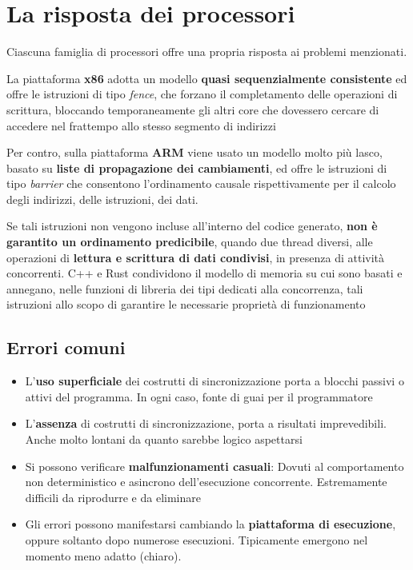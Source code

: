 \section{La risposta dei processori}

Ciascuna famiglia di processori offre una propria risposta ai problemi menzionati.

La piattaforma \textbf{x86} adotta un modello \textbf{quasi sequenzialmente consistente} ed offre
le istruzioni di tipo \textit{fence}, che forzano il completamento delle operazioni di
scrittura, bloccando temporaneamente gli altri core che dovessero cercare di
accedere nel frattempo allo stesso segmento di indirizzi

Per contro, sulla
piattaforma \textbf{ARM} viene usato un modello molto più lasco, basato su \textbf{liste di
  propagazione dei cambiamenti}, ed offre le istruzioni di tipo \textit{barrier} che
consentono l'ordinamento causale rispettivamente per il calcolo degli indirizzi,
delle istruzioni, dei dati.


Se tali istruzioni non vengono incluse all'interno del codice generato, \textbf{non è
  garantito un ordinamento predicibile}, quando due thread diversi, alle operazioni di \textbf{lettura e scrittura di
  dati condivisi}, in presenza di attività concorrenti.
C++ e Rust condividono il
modello di memoria su cui sono basati e annegano, nelle funzioni di libreria dei
tipi dedicati alla concorrenza, tali istruzioni allo scopo di garantire le
necessarie proprietà di funzionamento



\subsection{Errori comuni}

\begin{itemize}
  \item L'\textbf{uso superficiale} dei costrutti di sincronizzazione porta a blocchi
        passivi o attivi del programma. In ogni caso, fonte di guai per il
        programmatore
  \item L'\textbf{assenza} di costrutti di sincronizzazione, porta a risultati
        imprevedibili. Anche molto lontani da quanto sarebbe logico aspettarsi
  \item Si possono verificare \textbf{malfunzionamenti casuali}: Dovuti al
        comportamento non deterministico e asincrono dell'esecuzione concorrente.
        Estremamente difficili da riprodurre e da eliminare
  \item Gli errori possono manifestarsi cambiando la \textbf{piattaforma di esecuzione}, oppure
        soltanto dopo numerose esecuzioni. Tipicamente emergono nel momento
        meno adatto (chiaro).
\end{itemize}



